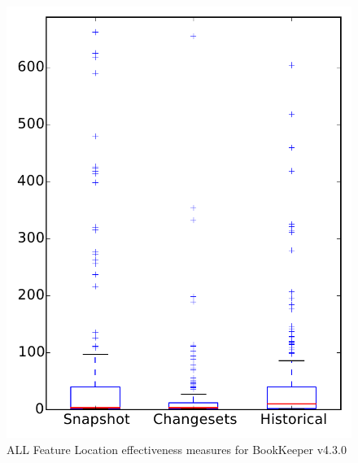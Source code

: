 
\begin{figure}
\centering
\includegraphics[height=0.4\textheight]{figures/flt/all_bookkeeper}
\caption{ALL Feature Location effectiveness measures for BookKeeper v4.3.0}
\label{fig:flt:all:bookkeeper}
\end{figure}
